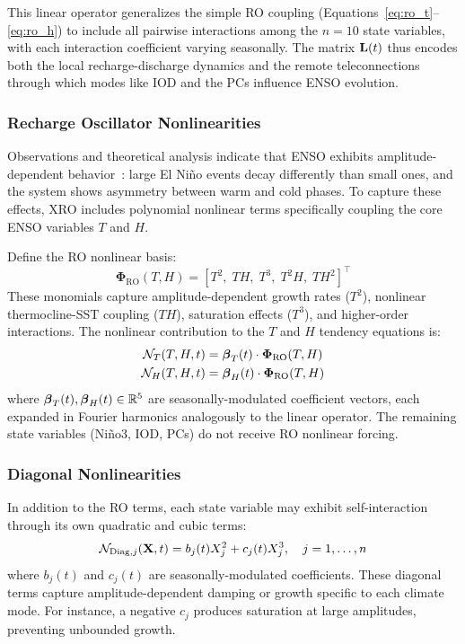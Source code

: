 This linear operator generalizes the simple RO coupling (Equations~\ref{eq:ro_t}--\ref{eq:ro_h}) to include all pairwise interactions among the $n=10$ state variables, with each interaction coefficient varying seasonally. The matrix $\mathbf{L}(t)$ thus encodes both the local recharge-discharge dynamics and the remote teleconnections through which modes like IOD and the PCs influence ENSO evolution.

\subsubsection{Recharge Oscillator Nonlinearities}

Observations and theoretical analysis indicate that ENSO exhibits amplitude-dependent behavior~\cite{an2004nonlinearity}: large El Ni\~no events decay differently than small ones, and the system shows asymmetry between warm and cold phases. To capture these effects, XRO includes polynomial nonlinear terms specifically coupling the core ENSO variables $T$ and $H$.

Define the RO nonlinear basis:
\begin{equation}
    \boldsymbol{\Phi}_{\text{RO}}(T, H) = [T^2,\; TH,\; T^3,\; T^2H,\; TH^2]^\top
    \label{eq:ro_basis}
\end{equation}
These monomials capture amplitude-dependent growth rates ($T^2$), nonlinear thermocline-SST coupling ($TH$), saturation effects ($T^3$), and higher-order interactions. The nonlinear contribution to the $T$ and $H$ tendency equations is:
\begin{align}
    \mathcal{N}_T(T, H, t) &= \boldsymbol{\beta}_T(t) \cdot \boldsymbol{\Phi}_{\text{RO}}(T, H) \\
    \mathcal{N}_H(T, H, t) &= \boldsymbol{\beta}_H(t) \cdot \boldsymbol{\Phi}_{\text{RO}}(T, H)
\end{align}
where $\boldsymbol{\beta}_T(t), \boldsymbol{\beta}_H(t) \in \mathbb{R}^5$ are seasonally-modulated coefficient vectors, each expanded in Fourier harmonics analogously to the linear operator. The remaining state variables (Ni\~no3, IOD, PCs) do not receive RO nonlinear forcing.

\subsubsection{Diagonal Nonlinearities}

In addition to the RO terms, each state variable may exhibit self-interaction through its own quadratic and cubic terms:
\begin{equation}
    \mathcal{N}_{\text{Diag},j}(\mathbf{X}, t) = b_j(t) X_j^2 + c_j(t) X_j^3, \quad j = 1, \ldots, n
\end{equation}
where $b_j(t)$ and $c_j(t)$ are seasonally-modulated coefficients. These diagonal terms capture amplitude-dependent damping or growth specific to each climate mode. For instance, a negative $c_j$ produces saturation at large amplitudes, preventing unbounded growth.

